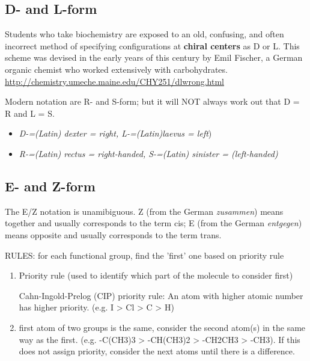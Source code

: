 \subsection{D- and L-form}
\label{sec:D-and-L-form}
\label{sec:L-isomer}
\label{sec:D-isomer}
\label{sec:chiral-center}


Students who take biochemistry are exposed to an old, confusing, and often
incorrect method of specifying configurations at {\bf chiral centers} as D or L.
This scheme was devised in the early years of this century by Emil Fischer, a German
organic chemist who worked extensively with carbohydrates.
\url{http://chemistry.umeche.maine.edu/CHY251/dlwrong.html}


Modern notation are R- and S-form; but it will NOT always work out that D = R
and L = S.
\begin{itemize}
  \item {\it D-=(Latin) dexter = right, L-=(Latin)laevus = left})
  \item {\it R-=(Latin) rectus = right-handed, S-=(Latin) sinister =
  (left-handed)}
\end{itemize}

\subsection{E- and Z-form}
\label{sec:E-Z-notation}

The E/Z notation is unamibiguous. Z (from the German {\it zusammen}) means
together and usually corresponds to the term cis; E (from the German
{\it entgegen}) means opposite and usually corresponds to the term trans.

RULES: for each functional group, find the 'first' one based on priority rule
\begin{enumerate}
  \item Priority rule (used to identify which part of the molecule to consider
  first)
  
  Cahn-Ingold-Prelog (CIP) priority rule: An atom with higher atomic number has
  higher priority. (e.g. I > Cl > C > H)
  
  
  \item first atom of two groups is the same, consider the second atom(s) in the
  same way as the first. (e.g. -C(CH3)3 > -CH(CH3)2 > -CH2CH3 > -CH3). If this
  does not assign priority, consider the next atoms until there is a difference.
  
  
\end{enumerate}


